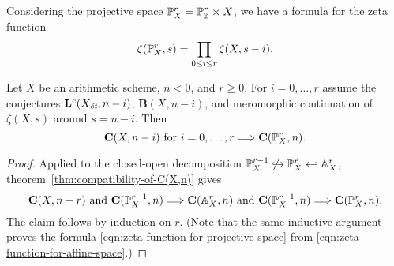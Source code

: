 \documentclass{article}
\numberwithin{equation}{section}
\begin{document}
Considering the projective space $\PP_X^r = \PP_\ZZ^r \times X$,
we have a formula for the zeta function
\begin{equation}
  \label{eqn:zeta-function-for-projective-space}
  \zeta (\PP_X^r, s) = \prod_{0 \le i \le r} \zeta (X, s-i).
\end{equation}

\begin{corollary}
  Let $X$ be an arithmetic scheme, $n < 0$, and $r \ge 0$.
  For $i = 0,\ldots,r$ assume the conjectures $\mathbf{L}^c (X_\et,n-i)$,
  $\mathbf{B} (X,n-i)$, and meromorphic continuation of $\zeta (X,s)$ around
  $s = n-i$. Then
  \[ \mathbf{C} (X,n-i)\text{ for }i = 0,\ldots,r \Longrightarrow
    \mathbf{C} (\PP_X^r, n). \]

  \begin{proof}
    Applied to the closed-open decomposition
    $\PP_X^{r-1} \not\hookrightarrow \PP_X^r \hookleftarrow \AA_X^r$,
    theorem~\ref{thm:compatibility-of-C(X,n)} gives
    \[ \mathbf{C} (X, n-r) \text{ and } \mathbf{C} (\PP_X^{r-1}, n)
      \Longrightarrow
      \mathbf{C} (\AA_X^r, n) \text{ and } \mathbf{C} (\PP_X^{r-1}, n)
      \Longrightarrow
      \mathbf{C} (\PP_X^r,n). \]
    The claim follows by induction on $r$.
    (Note that the same inductive argument proves the formula
    \eqref{eqn:zeta-function-for-projective-space} from
    \eqref{eqn:zeta-function-for-affine-space}.)
    \end{proof}
\end{corollary}
\end{document}
